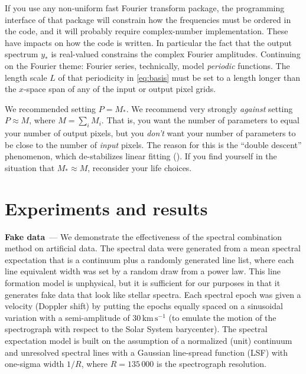\documentclass[modern]{aastex631}
\renewcommand{\paragraph}[1]{\medskip\par\noindent\textbf{#1}~---}
\newcommand{\unit}[1]{\mathrm{#1}}
\newcommand{\kmps}{\unit{km\,s^{-1}}}
\begin{document}
If you use any non-uniform fast Fourier transform package, the programming interface of that package will constrain how the frequencies must be ordered in the code, and it will probably require complex-number implementation.
These have impacts on how the code is written.
In particular the fact that the output spectrum $y_\ast$ is real-valued constrains the complex Fourier amplitudes.
Continuing on the Fourier theme:
Fourier series, technically, model \emph{periodic} functions.
The length scale $L$ of that periodicity in \eqref{eq:basis} must be set to a length longer than the $x$-space span of any of the input or output pixel grids.

We recommended setting $P=M_\ast$.
We recommend very strongly \emph{against} setting $P\approx M$, where $M=\sum_i M_i$.
That is, you want the number of parameters to equal your number of output pixels, but you \emph{don't} want your number of parameters to be close to the number of \emph{input} pixels.
The reason for this is the ``double descent'' phenomenon, which de-stabilizes linear fitting (\citealt{doubledescent}).
If you find yourself in the situation that $M_\ast\approx M$, reconsider your life choices.

\section{Experiments and results}\label{sec:results}

\paragraph{Fake data}
We demonstrate the effectiveness of the spectral combination method on artificial data.
The spectral data were generated from a mean spectral expectation that is a continuum plus a randomly generated line list, where each line equivalent width was set by a random draw from a power law. 
This line formation model is unphysical, but it is sufficient for our purposes in that it generates fake data that look like stellar spectra.
Each spectral epoch was given a velocity (Doppler shift) by putting the epochs equally spaced on a sinusoidal variation with a semi-amplitude of $30\,\kmps$ (to emulate the motion of the spectrograph with respect to the Solar System barycenter).
The spectral expectation model is built on the assumption of a normalized (unit) continuum and unresolved spectral lines with a Gaussian line-spread function (LSF) with one-sigma width $1/R$, where $R=135\,000$ is the spectrograph resolution.
\end{document}
